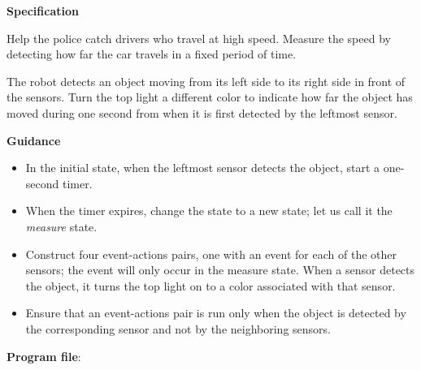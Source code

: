 
\label{ch.radar}

\textbf{Specification}

Help the police catch drivers who travel at high speed. Measure the
speed by detecting how far the car travels in a fixed period of time.

The robot detects an object moving from its left side to its right side
in front of the sensors. Turn the top light a different color to
indicate how far the object has moved during one second from when it is
first detected by the leftmost sensor.

\textbf{Guidance}

\begin{itemize}

\item In the initial state, when the leftmost sensor detects the object,
start a one-second timer.

\item When the timer expires, change the state to a new state; let us
call it the \emph{measure} state.

\item Construct four event-actions pairs, one with an event for each of
the other sensors; the event will only occur in the measure state. When
a sensor detects the object, it turns the top light on to a color
associated with that sensor.

\item Ensure that an event-actions pair is run only when the object is
detected by the corresponding sensor and not by the neighboring sensors.

\end{itemize}

\bigskip

{\raggedleft \hfill \textbf{Program file}: }
